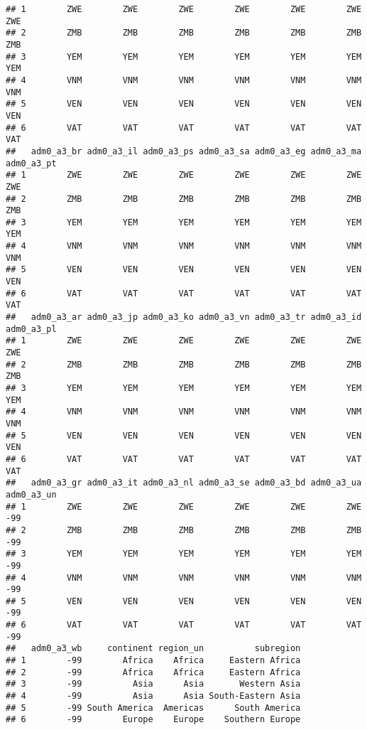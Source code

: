 \documentclass[
]{article}
\begin{document}
\begin{verbatim}
## 1        ZWE        ZWE        ZWE        ZWE        ZWE        ZWE        ZWE
## 2        ZMB        ZMB        ZMB        ZMB        ZMB        ZMB        ZMB
## 3        YEM        YEM        YEM        YEM        YEM        YEM        YEM
## 4        VNM        VNM        VNM        VNM        VNM        VNM        VNM
## 5        VEN        VEN        VEN        VEN        VEN        VEN        VEN
## 6        VAT        VAT        VAT        VAT        VAT        VAT        VAT
##   adm0_a3_br adm0_a3_il adm0_a3_ps adm0_a3_sa adm0_a3_eg adm0_a3_ma adm0_a3_pt
## 1        ZWE        ZWE        ZWE        ZWE        ZWE        ZWE        ZWE
## 2        ZMB        ZMB        ZMB        ZMB        ZMB        ZMB        ZMB
## 3        YEM        YEM        YEM        YEM        YEM        YEM        YEM
## 4        VNM        VNM        VNM        VNM        VNM        VNM        VNM
## 5        VEN        VEN        VEN        VEN        VEN        VEN        VEN
## 6        VAT        VAT        VAT        VAT        VAT        VAT        VAT
##   adm0_a3_ar adm0_a3_jp adm0_a3_ko adm0_a3_vn adm0_a3_tr adm0_a3_id adm0_a3_pl
## 1        ZWE        ZWE        ZWE        ZWE        ZWE        ZWE        ZWE
## 2        ZMB        ZMB        ZMB        ZMB        ZMB        ZMB        ZMB
## 3        YEM        YEM        YEM        YEM        YEM        YEM        YEM
## 4        VNM        VNM        VNM        VNM        VNM        VNM        VNM
## 5        VEN        VEN        VEN        VEN        VEN        VEN        VEN
## 6        VAT        VAT        VAT        VAT        VAT        VAT        VAT
##   adm0_a3_gr adm0_a3_it adm0_a3_nl adm0_a3_se adm0_a3_bd adm0_a3_ua adm0_a3_un
## 1        ZWE        ZWE        ZWE        ZWE        ZWE        ZWE        -99
## 2        ZMB        ZMB        ZMB        ZMB        ZMB        ZMB        -99
## 3        YEM        YEM        YEM        YEM        YEM        YEM        -99
## 4        VNM        VNM        VNM        VNM        VNM        VNM        -99
## 5        VEN        VEN        VEN        VEN        VEN        VEN        -99
## 6        VAT        VAT        VAT        VAT        VAT        VAT        -99
##   adm0_a3_wb     continent region_un          subregion
## 1        -99        Africa    Africa     Eastern Africa
## 2        -99        Africa    Africa     Eastern Africa
## 3        -99          Asia      Asia       Western Asia
## 4        -99          Asia      Asia South-Eastern Asia
## 5        -99 South America  Americas      South America
## 6        -99        Europe    Europe    Southern Europe

\end{verbatim}
\end{document}
